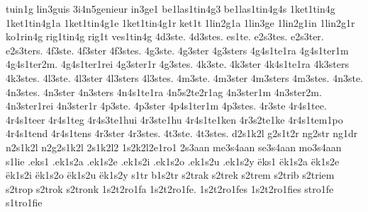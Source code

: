 {%
tuin1g
lin3guis
%
3i4n5genieur
%
%
in3ge1
%
be1las1tin4g3
be1las1tin4g4s
1ket1tin4g
1ket1tin4g1a
1ket1tin4g1e
1ket1tin4g1r
ket1t
1lin2g1a
1lin3ge
1lin2g1in
1lin2g1r
ko1rin4g
rig1tin4g
rig1t
ves1tin4g
%
4d3ste.
4d3stes.
es1te.
e2s3tes.
e2s3ter.
e2s3ters.
4f3ste.
4f3ster
4f3stes.
4g3ste.
4g3ster
4g3sters
4g4s1te1ra
4g4s1ter1m
4g4s1ter2m.
4g4s1ter1rei
4g3ster1r
4g3stes.
4k3ste.
4k3ster
4k4s1te1ra
4k3sters
4k3stes.
4l3ste.
4l3ster
4l3sters
4l3stes.
4m3ste.
4m3ster
4m3sters
4m3stes.
4n3ste.
4n3stes.
4n3ster
4n3sters
4n4s1te1ra
4n5s2te2r1ag
4n3ster1m
4n3ster2m.
4n3ster1rei
4n3ster1r
4p3ste.
4p3ster
4p4s1ter1m
4p3stes.
4r3ste
4r4s1tee.
4r4s1teer
4r4s1teg
4r4s3te1hui
4r3ste1hu
4r4s1te1ken
4r3s2te1ke
4r4s1tem1po
4r4s1tend
4r4s1tens
4r3ster
4r3stes.
4t3ste.
4t3stes.
%
%
d2s1k2l
g2s1t2r
ng2str
ng1dr
n2s1k2l
n2g2s1k2l
%
2s1k2l2
1s2k2l2e1ro1
%
%
2s3aan
me3s4aan
se3s4aan
mo3s4aan
s1lie
%
.eks1
.ek1s2a
.ek1s2e
.ek1s2i
.ek1s2o
.ek1s2u
.ek1s2y
ëks1
ëk1s2a
ëk1s2e
ëk1s2i
ëk1s2o
ëk1s2u
ëk1s2y
%
%
s1tr
b1s2tr
s2trak
s2trek
s2trem
s2trib
s2triem
s2trop
s2trok
s2tronk
%
1s2t2ro1fa
1s2t2ro1fe.
1s2t2ro1fes
1s2t2ro1fies
stro1fe
s1tro1fie
}
